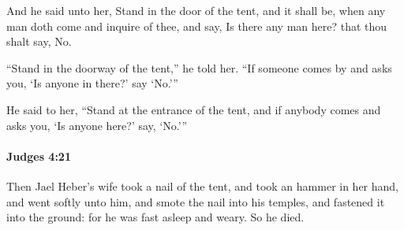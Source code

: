 			\begin{versebox}
					\item[BHS] 
					\item[ASV] And he said unto her, Stand in the door of the tent, and it shall be, when any man doth come and inquire of thee, and say, Is there any man here? that thou shalt say, No.
					\item[NIV] “Stand in the doorway of the tent,” he told her. “If someone comes by and asks you, ‘Is anyone in there?’ say ‘No.’”
					\item[NRSV] He said to her, “Stand at the entrance of the tent, and if anybody comes and asks you, ‘Is anyone here?’ say, ‘No.’”
			\end{versebox}

		\paragraph{Judges 4:21} %
			\label{JUDGES-4-21}

			Then Jael Heber’s wife took a nail of the tent, and took an hammer in her hand, and went softly unto him, and smote the nail into his temples, and fastened it into the ground: for he was fast asleep and weary. So he died.

